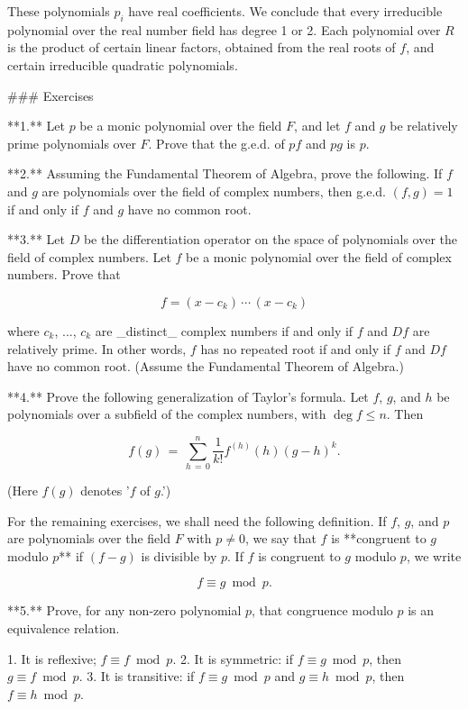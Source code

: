 These polynomials \(p_{i}\) have real coefficients. We conclude that every irreducible polynomial over the real number field has degree 1 or 2. Each polynomial over \(R\) is the product of certain linear factors, obtained from the real roots of \(f\), and certain irreducible quadratic polynomials.

### Exercises

**1.** Let \(p\) be a monic polynomial over the field \(F\), and let \(f\) and \(g\) be relatively prime polynomials over \(F\). Prove that the g.e.d. of \(pf\) and \(pg\) is \(p\).

**2.** Assuming the Fundamental Theorem of Algebra, prove the following. If \(f\) and \(g\) are polynomials over the field of complex numbers, then g.e.d. \((f,g)=1\) if and only if \(f\) and \(g\) have no common root.

**3.** Let \(D\) be the differentiation operator on the space of polynomials over the field of complex numbers. Let \(f\) be a monic polynomial over the field of complex numbers. Prove that

\[f=(x-c_{k})\,\cdots\,(x-c_{k})\]

where \(c_{k}\), ..., \(c_{k}\) are _distinct_ complex numbers if and only if \(f\) and \(Df\) are relatively prime. In other words, \(f\) has no repeated root if and only if \(f\) and \(Df\) have no common root. (Assume the Fundamental Theorem of Algebra.)

**4.** Prove the following generalization of Taylor's formula. Let \(f\), \(g\), and \(h\) be polynomials over a subfield of the complex numbers, with \(\deg f\leq n\). Then

\[f(g)\,=\,\sum\limits_{h\,=\,0}^{n}\frac{1}{k!}f^{(h)}(h)(g-h)^{k}.\]

(Here \(f(g)\) denotes '\(f\) of \(g\).')

For the remaining exercises, we shall need the following definition. If \(f\), \(g\), and \(p\) are polynomials over the field \(F\) with \(p\neq 0\), we say that \(f\) is **congruent to \(g\) modulo \(p\)** if \((f-g)\) is divisible by \(p\). If \(f\) is congruent to \(g\) modulo \(p\), we write

\[f\equiv g\bmod p.\]

**5.** Prove, for any non-zero polynomial \(p\), that congruence modulo \(p\) is an equivalence relation.

1. It is reflexive; \(f\equiv f\bmod p\).
2. It is symmetric: if \(f\equiv g\bmod p\), then \(g\equiv f\bmod p\).
3. It is transitive: if \(f\equiv g\bmod p\) and \(g\equiv h\bmod p\), then \(f\equiv h\bmod p\).

